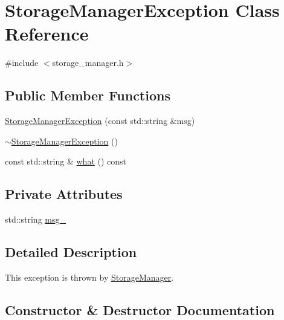 \hypertarget{classStorageManagerException}{}\section{Storage\+Manager\+Exception Class Reference}
\label{classStorageManagerException}


{\ttfamily \#include $<$storage\+\_\+manager.\+h$>$}

\subsection*{Public Member Functions}
\begin{DoxyCompactItemize}
\item 
\hyperlink{classStorageManagerException_a3389d6bbb6910fbd8e711fc8bdd13bf0}{Storage\+Manager\+Exception} (const std\+::string \&msg)
\item 
\hyperlink{classStorageManagerException_ac0cbbd2a8aece456d7bdbe4af24d057c}{$\sim$\+Storage\+Manager\+Exception} ()
\item 
const std\+::string \& \hyperlink{classStorageManagerException_a718805e3f71b40fe9045ed1bdff9a66d}{what} () const 
\end{DoxyCompactItemize}
\subsection*{Private Attributes}
\begin{DoxyCompactItemize}
\item 
std\+::string \hyperlink{classStorageManagerException_a27cd47592b9bd7cf5fb83dcb6ba78b28}{msg\+\_\+}
\end{DoxyCompactItemize}


\subsection{Detailed Description}
This exception is thrown by \hyperlink{classStorageManager}{Storage\+Manager}. 

\subsection{Constructor \& Destructor Documentation}
\hypertarget{classStorageManagerException_a3389d6bbb6910fbd8e711fc8bdd13bf0}{}
